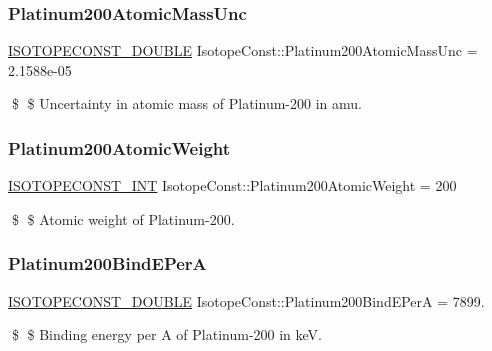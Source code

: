 \subsubsection{\texorpdfstring{Platinum200\+Atomic\+Mass\+Unc}{Platinum200AtomicMassUnc}}
{\footnotesize\ttfamily \mbox{\hyperlink{group___isotope_const-_macros_ga8f45a7272ce02c0b4c65c44636ed719a}{I\+S\+O\+T\+O\+P\+E\+C\+O\+N\+S\+T\+\_\+\+D\+O\+U\+B\+LE}} Isotope\+Const\+::\+Platinum200\+Atomic\+Mass\+Unc = 2.\+1588e-\/05}

\$ \$ Uncertainty in atomic mass of Platinum-\/200 in amu. \mbox{\label{group___isotope_const-_platinum-_pt200_ga94ea6e2d4b1cb3d40ea85bb42afdee39}} 
\subsubsection{\texorpdfstring{Platinum200\+Atomic\+Weight}{Platinum200AtomicWeight}}
{\footnotesize\ttfamily \mbox{\hyperlink{group___isotope_const-_macros_ga5f18360b3e99483a35c32d789e62621c}{I\+S\+O\+T\+O\+P\+E\+C\+O\+N\+S\+T\+\_\+\+I\+NT}} Isotope\+Const\+::\+Platinum200\+Atomic\+Weight = 200}

\$ \$ Atomic weight of Platinum-\/200. \mbox{\label{group___isotope_const-_platinum-_pt200_ga07ed13c64542bc070cb3d8d0350e1c18}} 
\subsubsection{\texorpdfstring{Platinum200\+Bind\+E\+PerA}{Platinum200BindEPerA}}
{\footnotesize\ttfamily \mbox{\hyperlink{group___isotope_const-_macros_ga8f45a7272ce02c0b4c65c44636ed719a}{I\+S\+O\+T\+O\+P\+E\+C\+O\+N\+S\+T\+\_\+\+D\+O\+U\+B\+LE}} Isotope\+Const\+::\+Platinum200\+Bind\+E\+PerA = 7899.}

\$ \$ Binding energy per A of Platinum-\/200 in keV. \mbox{\label{group___isotope_const-_platinum-_pt200_gac70949103cf44ebb228495dafdc00476}} 
